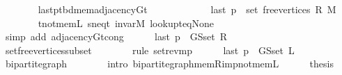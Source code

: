 \begin{isabellebody}
\ \ \ \ \ \ \isamarkupfalse%
\ last{\isacharunderscore}{\kern0pt}p{\isacharunderscore}{\kern0pt}tbd{\isacharunderscore}{\kern0pt}mem{\isacharunderscore}{\kern0pt}adjacency{\isacharunderscore}{\kern0pt}G{}{\isacharunderscore}{\kern0pt}t\isanewline
\ \ \ \ \ \ \isacommand{{\isachardot}{\kern0pt}}\isamarkupfalse%
\isanewline
\ \ \ \ \isamarkupfalse%
\ {\isachardoublequoteopen}last\ {\isacharquery}{\kern0pt}p\ {\isasymin}\ set\ {\isacharparenleft}{\kern0pt}free{\isacharunderscore}{\kern0pt}vertices\ R\ M{\isacharparenright}{\kern0pt}{\isachardoublequoteclose}\isanewline
\ \ \ \ \ \ \isamarkupfalse%
\ t{\isacharunderscore}{\kern0pt}not{\isacharunderscore}{\kern0pt}mem{\isacharunderscore}{\kern0pt}L\ s{\isacharunderscore}{\kern0pt}neq{\isacharunderscore}{\kern0pt}t\ invar{\isacharunderscore}{\kern0pt}M\ lookup{\isacharunderscore}{\kern0pt}t{\isacharunderscore}{\kern0pt}eq{\isacharunderscore}{\kern0pt}None\isanewline
\ \ \ \ \ \ \isamarkupfalse%
\ {\isacharparenleft}{\kern0pt}simp\ add{\isacharcolon}{\kern0pt}\ adjacency{\isacharunderscore}{\kern0pt}G{}{\isacharunderscore}{\kern0pt}t{\isacharunderscore}{\kern0pt}cong{\isacharparenright}{\kern0pt}\isanewline
\ \ \ \ \isamarkupfalse%
\ {\isachardoublequoteopen}last\ {\isacharquery}{\kern0pt}p\ {\isasymin}\ G{\isachardot}{\kern0pt}S{\isachardot}{\kern0pt}set\ R{\isachardoublequoteclose}\isanewline
\ \ \ \ \ \ \isamarkupfalse%
\ set{\isacharunderscore}{\kern0pt}free{\isacharunderscore}{\kern0pt}vertices{\isacharunderscore}{\kern0pt}subset\isanewline
\ \ \ \ \ \ \isamarkupfalse%
\ {\isacharparenleft}{\kern0pt}rule\ set{\isacharunderscore}{\kern0pt}rev{\isacharunderscore}{\kern0pt}mp{\isacharparenright}{\kern0pt}\isanewline
\ \ \ \ \isamarkupfalse%
\ {\isachardoublequoteopen}last\ {\isacharquery}{\kern0pt}p\ {\isasymnotin}\ G{\isachardot}{\kern0pt}S{\isachardot}{\kern0pt}set\ L{\isachardoublequoteclose}\isanewline
\ \ \ \ \ \ \isamarkupfalse%
\ bipartite{\isacharunderscore}{\kern0pt}graph\isanewline
\ \ \ \ \ \ \isamarkupfalse%
\ {\isacharparenleft}{\kern0pt}intro\ bipartite{\isacharunderscore}{\kern0pt}graph{\isachardot}{\kern0pt}mem{\isacharunderscore}{\kern0pt}R{\isacharunderscore}{\kern0pt}imp{\isacharunderscore}{\kern0pt}not{\isacharunderscore}{\kern0pt}mem{\isacharunderscore}{\kern0pt}L{\isacharparenright}{\kern0pt}\isanewline
\ \ \ \ \isamarkupfalse%
\ {\isacharquery}{\kern0pt}thesis\isanewline
\ \ \ \ \ \ \isamarkupfalse%

\end{isabellebody}
